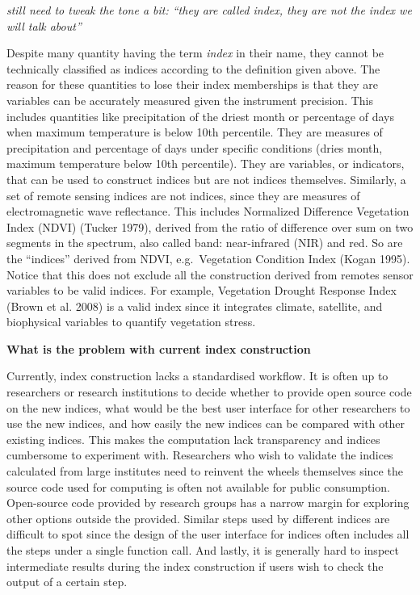 \documentclass[
]{article}
\begin{document}
\emph{still need to tweak the tone a bit: ``they are called index, they
are not the index we will talk about''}

Despite many quantity having the term \emph{index} in their name, they
cannot be technically classified as indices according to the definition
given above. The reason for these quantities to lose their index
memberships is that they are variables can be accurately measured given
the instrument precision. This includes quantities like precipitation of
the driest month or percentage of days when maximum temperature is below
10th percentile. They are measures of precipitation and percentage of
days under specific conditions (dries month, maximum temperature below
10th percentile). They are variables, or indicators, that can be used to
construct indices but are not indices themselves. Similarly, a set of
remote sensing indices are not indices, since they are measures of
electromagnetic wave reflectance. This includes Normalized Difference
Vegetation Index (NDVI) (Tucker 1979), derived from the ratio of
difference over sum on two segments in the spectrum, also called band:
near-infrared (NIR) and red. So are the ``indices'' derived from NDVI,
e.g.~Vegetation Condition Index (Kogan 1995). Notice that this does not
exclude all the construction derived from remotes sensor variables to be
valid indices. For example, Vegetation Drought Response Index (Brown et
al. 2008) is a valid index since it integrates climate, satellite, and
biophysical variables to quantify vegetation stress.

\newpage

\textbf{What is the problem with current index construction}

Currently, index construction lacks a standardised workflow. It is often
up to researchers or research institutions to decide whether to provide
open source code on the new indices, what would be the best user
interface for other researchers to use the new indices, and how easily
the new indices can be compared with other existing indices. This makes
the computation lack transparency and indices cumbersome to experiment
with. Researchers who wish to validate the indices calculated from large
institutes need to reinvent the wheels themselves since the source code
used for computing is often not available for public consumption.
Open-source code provided by research groups has a narrow margin for
exploring other options outside the provided. Similar steps used by
different indices are difficult to spot since the design of the user
interface for indices often includes all the steps under a single
function call. And lastly, it is generally hard to inspect intermediate
results during the index construction if users wish to check the output
of a certain step.
\end{document}
